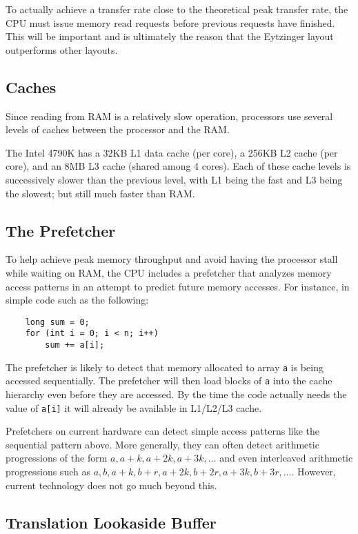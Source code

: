 \documentclass{patmorin}
\begin{document}
To actually achieve a transfer rate close to the theoretical peak transfer
rate, the CPU must issue memory read requests before previous requests
have finished. This will be important and is ultimately the reason that
the Eytzinger layout outperforms other layouts.

\subsection{Caches}

Since reading from RAM is a relatively slow operation, processors use
several levels of caches between the processor and the RAM.

The Intel 4790K has a 32KB L1 data cache (per core), a 256KB L2 cache
(per core), and an 8MB L3 cache (shared among 4 cores).  Each of these
cache levels is successively slower than the previous level, with L1 being
the fast and L3 being the slowest; but still much faster than RAM.

\subsection{The Prefetcher}

To help achieve peak memory throughput and avoid having the processor
stall while waiting on RAM, the CPU includes a prefetcher that analyzes
memory access patterns in an attempt to predict future memory accesses.
For instance, in simple code such as the following:

\begin{verbatim}
    long sum = 0;
    for (int i = 0; i < n; i++) 
        sum += a[i];
\end{verbatim}

The prefetcher is likely to detect that memory allocated to array
\texttt{a} is being accessed sequentially.  The prefetcher will
then load blocks of \texttt{a} into the cache hierarchy even
before they are accessed.  By the time the code actually needs the value
of \texttt{a[i]} it will already be available in L1/L2/L3 cache.

Prefetchers on current hardware can detect simple access patterns
like the sequential pattern above.  More generally, they can often
detect arithmetic progressions of the form $a,a+k,a+2k,a+3k,\ldots$
and even interleaved arithmetic progressions such as $a, b, a+k, b+r,
a+2k,b+2r,a+3k,b+3r,\ldots$.  However, current technology does not go
much beyond this.

\subsection{Translation Lookaside Buffer}
\end{document}
